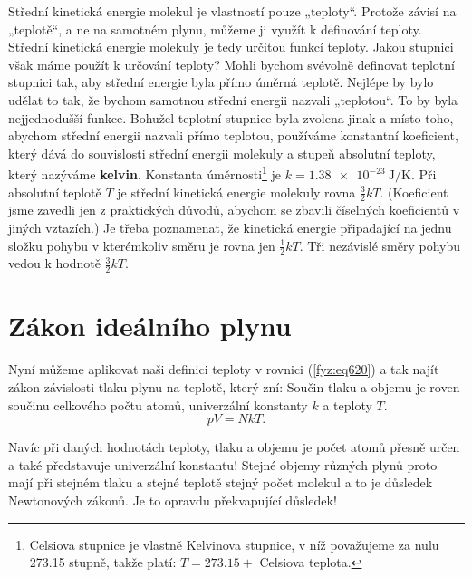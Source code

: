     Střední kinetická energie molekul je vlastností pouze „teploty“. Protože závisí na „teplotě“, a
    ne na samotném plynu, můžeme ji využít k definování teploty. Střední kinetická energie molekuly
    je tedy určitou funkcí teploty. Jakou stupnici však máme použít k určování teploty? Mohli bychom
    svévolně definovat teplotní stupnici tak, aby střední energie byla přímo úměrná teplotě. Nejlépe
    by bylo udělat to tak, že bychom samotnou střední energii nazvali „teplotou“. To by byla
    nejjednodušší funkce. Bohužel teplotní stupnice byla zvolena jinak a místo toho, abychom střední
    energii nazvali přímo teplotou, používáme konstantní koeﬁcient, který dává do souvislosti
    střední energii molekuly a stupeň absolutní teploty, který nazýváme \textbf{kelvin}. Konstanta
    úměrnosti\footnote{Celsiova stupnice je vlastně Kelvinova stupnice, v níž považujeme za nulu
    \num{273.15} stupně, takže platí: \(T = \num{273.15} +\) Celsiova teplota.} je \(k =
    \qty{1.38e-23}{\joule\per\kelvin}\). Při absolutní teplotě \(T\) je střední kinetická energie
    molekuly rovna \(\frac{3}{2}kT\). (Koeﬁcient  jsme zavedli jen z praktických důvodů,
    abychom se zbavili číselných koeﬁcientů v jiných vztazích.) Je třeba poznamenat, že kinetická
    energie připadající na jednu složku pohybu v kterémkoliv směru je rovna jen \(\frac{1}{2}kT\).
    Tři nezávislé směry pohybu vedou k hodnotě \(\frac{3}{2}kT\).

  \section{Zákon ideálního plynu}\label{fyz:IchapIXLsecV}
    Nyní můžeme aplikovat naši definici teploty v rovnici (\ref{fyz:eq620}) a tak najít zákon
    závislosti tlaku plynu na teplotě, který zní: Součin tlaku a objemu je roven součinu celkového
    počtu atomů, univerzální konstanty \(k\) a teploty \(T\).
    \begin{equation}\label{fyz:eq632}
      \boxed{pV=NkT}.
    \end{equation}

    Navíc při daných hodnotách teploty, tlaku a objemu je počet atomů přesně určen a také
    představuje univerzální konstantu! Stejné objemy různých plynů proto mají při stejném tlaku a
    stejné teplotě stejný počet molekul a to je důsledek Newtonových zákonů. Je to opravdu
    překvapující důsledek!

